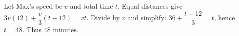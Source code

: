 Let Max's speed be $v$ and total time $t$. Equal distances give $3v(12)+\dfrac{v}{3}(t-12)=vt$. Divide by $v$ and simplify: $36+\dfrac{t-12}{3}=t$, hence $t=48$. Thus $\boxed{48\text{ minutes}}$.

